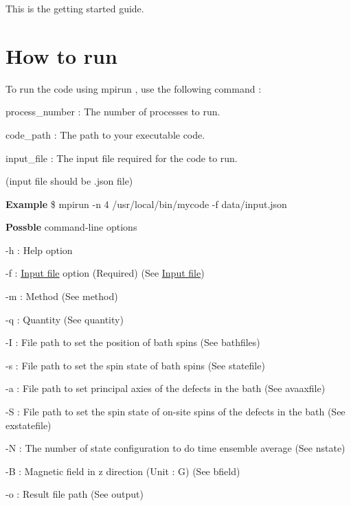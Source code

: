 This is the getting started guide.\hypertarget{GettingStarted_HowToRun}{}\section{How to run}\label{GettingStarted_HowToRun}
To run the code using {\ttfamily  mpirun }, use the following command \-:





\begin{DoxyItemize}
\item process\-\_\-number \-: The number of processes to run.
\item code\-\_\-path \-: The path to your executable code.
\item input\-\_\-file \-: The input file required for the code to run. \par

\begin{DoxyItemize}
\item (input file should be {\ttfamily .json} file)
\end{DoxyItemize}
\end{DoxyItemize}

{\bfseries Example} {\bfseries }  \$ mpirun -\/n 4 /usr/local/bin/mycode -\/f data/input.\-json 

{\bfseries Possble} command-\/line options {\bfseries } 


\begin{DoxyItemize}
\item -\/h \-: Help option
\item -\/f \-: \hyperlink{InputFile}{Input file} option (Required) (See \hyperlink{InputFile}{Input file})
\item -\/m \-: Method (See method)
\item -\/q \-: Quantity (See quantity)
\item -\/\-I \-: File path to set the position of bath spins (See bathfiles)
\item -\/s \-: File path to set the spin state of bath spins (See statefile)
\item -\/a \-: File path to set principal axies of the defects in the bath (See avaaxfile)
\item -\/\-S \-: File path to set the spin state of on-\/site spins of the defects in the bath (See exstatefile) 
\item -\/\-N \-: The number of state configuration to do time ensemble average (See nstate)
\item -\/\-B \-: Magnetic field in z direction (Unit \-: G) (See bfield)
\item -\/o \-: Result file path (See output)
\end{DoxyItemize}

